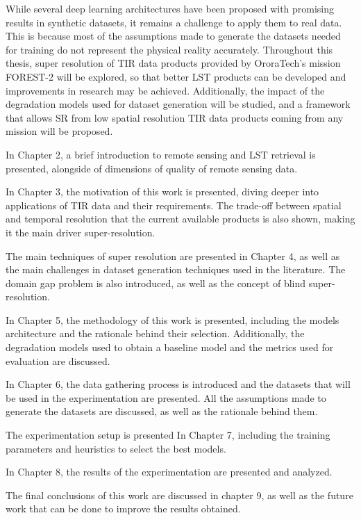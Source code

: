 While several deep learning architectures have been proposed with promising results in synthetic datasets, it remains a challenge to apply them to real data.
This is because most of the assumptions made to generate the datasets needed for training do not represent the physical reality accurately.
Throughout this thesis, super resolution of TIR data products provided by OroraTech's mission FOREST-2 will be explored, so that better LST products can be developed and improvements in research may be achieved.
Additionally, the impact of the degradation models used for dataset generation will be studied, and a framework that allows SR from low spatial resolution TIR data products coming from any mission will be proposed.
 
In Chapter 2, a brief introduction to remote sensing and LST retrieval is presented, alongside of dimensions of quality of remote sensing data.

In Chapter 3, the motivation of this work is presented, diving deeper into applications of TIR data and their requirements.
The trade-off between spatial and temporal resolution that the current available products is also shown, making it the main driver super-resolution.

The main techniques of super resolution are presented in Chapter 4, as well as the main challenges in dataset generation techniques used in the literature.
The domain gap problem is also introduced, as well as the concept of blind super-resolution.

In Chapter 5, the methodology of this work is presented, including the models architecture and the rationale behind their selection. Additionally, the degradation models used to obtain a baseline model and the metrics used for evaluation are discussed.

In Chapter 6, the data gathering process is introduced and the datasets that will be used in the experimentation are presented. All the assumptions made to generate the datasets are discussed, as well as the rationale behind them.

The experimentation setup is presented In Chapter 7, including the training parameters and heuristics to select the best models.

In Chapter 8, the results of the experimentation are presented and analyzed.

The final conclusions of this work are discussed in chapter 9, as well as the future work that can be done to improve the results obtained.

\newpage

